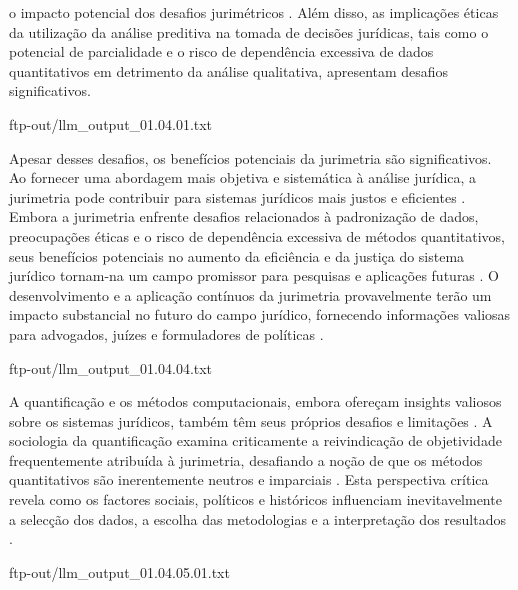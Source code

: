 o impacto potencial dos desafios jurimétricos \cite{jurimetricschallenges}. Além disso, as implicações éticas da utilização da análise preditiva na tomada de decisões jurídicas, tais como o potencial de parcialidade e o risco de dependência excessiva de dados quantitativos em detrimento da análise qualitativa, apresentam desafios significativos. 

ftp-out/llm_output_01.04.01.txt 

Apesar desses desafios, os benefícios potenciais da jurimetria são significativos. Ao fornecer uma abordagem mais objetiva e sistemática à análise jurídica, a jurimetria pode contribuir para sistemas jurídicos mais justos e eficientes \cite{jurimetricschallenges}. Embora a jurimetria enfrente desafios relacionados à padronização de dados, preocupações éticas e o risco de dependência excessiva de métodos quantitativos, seus benefícios potenciais no aumento da eficiência e da justiça do sistema jurídico tornam-na um campo promissor para pesquisas e aplicações futuras \cite{jurimetricschallenges }. O desenvolvimento e a aplicação contínuos da jurimetria provavelmente terão um impacto substancial no futuro do campo jurídico, fornecendo informações valiosas para advogados, juízes e formuladores de políticas \cite{jurimetricschallenges}. 

ftp-out/llm_output_01.04.04.txt 

A quantificação e os métodos computacionais, embora ofereçam insights valiosos sobre os sistemas jurídicos, também têm seus próprios desafios e limitações \cite{10.1590/dados.2022.65.3.267,10.1057/s41599- 020-00557-0}. A sociologia da quantificação examina criticamente a reivindicação de objetividade frequentemente atribuída à jurimetria, desafiando a noção de que os métodos quantitativos são inerentemente neutros e imparciais \cite{10.1590/dados.2022.65.3.267,10.1057/s41599-020-00557-0}. Esta perspectiva crítica revela como os factores sociais, políticos e históricos influenciam inevitavelmente a selecção dos dados, a escolha das metodologias e a interpretação dos resultados \cite{10.1590/dados.2022.65.3.267,salais2016quantification}. 

ftp-out/llm_output_01.04.05.01.txt 

